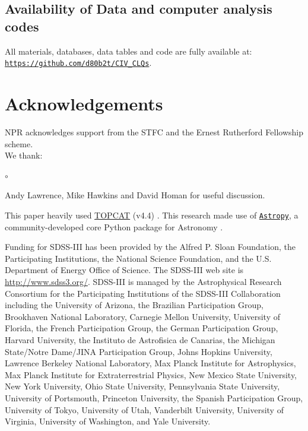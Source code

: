 \documentclass[fleqn,usenatbib]{mnras}
\begin{document}
\subsection*{Availability of Data and computer analysis codes} 
All materials, databases, data tables and code are fully available at: 
\href{https://github.com/d80b2t/CIV_CLQs}{\tt https://github.com/d80b2t/CIV\_CLQs}.


\section*{Acknowledgements}
NPR acknowledges support from the STFC and the Ernest Rutherford Fellowship scheme. 
\\

\noindent
We thank:
\begin{list}{$\circ$}{}
  \item Andy Lawrence, Mike Hawkins and David Homan for useful discussion.
\end{list}

This paper heavily used \href{http://www.star.bris.ac.uk/~mbt/topcat/}{TOPCAT} (v4.4)
\citep[][]{Taylor2005, Taylor2011}.
This research made use of \href{http://www.astropy.org}{\tt Astropy}, 
a community-developed core Python package for Astronomy 
\citep{AstropyCollaboration2013, AstropyCollaboration2018}.

Funding for SDSS-III has been provided by the Alfred P. Sloan
Foundation, the Participating Institutions, the National Science
Foundation, and the U.S. Department of Energy Office of Science. The
SDSS-III web site is
\href{http://www.sdss3.org/}{http://www.sdss3.org/}.
SDSS-III is managed by the Astrophysical Research Consortium for the
Participating Institutions of the SDSS-III Collaboration including the
University of Arizona, the Brazilian Participation Group, Brookhaven
National Laboratory, Carnegie Mellon University, University of
Florida, the French Participation Group, the German Participation
Group, Harvard University, the Instituto de Astrofisica de Canarias,
the Michigan State/Notre Dame/JINA Participation Group, Johns Hopkins
University, Lawrence Berkeley National Laboratory, Max Planck
Institute for Astrophysics, Max Planck Institute for Extraterrestrial
Physics, New Mexico State University, New York University, Ohio State
University, Pennsylvania State University, University of Portsmouth,
Princeton University, the Spanish Participation Group, University of
Tokyo, University of Utah, Vanderbilt University, University of
Virginia, University of Washington, and Yale University.
\end{document}
